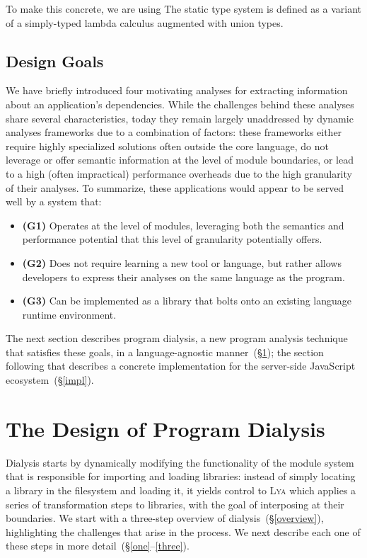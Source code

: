 \documentclass[letterpaper,twocolumn,10pt]{article}
\newcommand{\sx}[1]{(\S\ref{#1})}
\newcommand{\sys}{{\scshape Lya}\xspace}
\begin{document}
To make this concrete, we are using
The static type system is defined as a variant of a simply-typed lambda calculus augmented with union types.


\subsection{Design Goals}

We have briefly introduced four motivating analyses for extracting information about an application's dependencies.
While the challenges behind these analyses share several characteristics, today they remain largely unaddressed by dynamic analyses frameworks due to a combination of factors:
  these frameworks either require highly specialized solutions often outside the core language,
  do not leverage or offer semantic information at the level of module boundaries, or
  lead to a high (often impractical) performance overheads due to the high granularity of their analyses.
To summarize, these applications would appear to be served well by a system that:
\begin{itemize}
  \item \textbf{(G1)} Operates at the level of modules, leveraging both the semantics and performance potential that this level of granularity potentially offers.
  \item \textbf{(G2)} Does not require learning a new tool or language, but rather allows developers to express their analyses on the same language as the program.
  \item \textbf{(G3)} Can be implemented as a library that bolts onto an existing language runtime environment.
\end{itemize}

The next section describes program dialysis, a new program analysis technique that satisfies these goals, in a language-agnostic manner~\sx{design};
  the section following that describes a concrete implementation for the server-side JavaScript ecosystem~\sx{impl}.

\section{The Design of Program Dialysis}
\label{design}

Dialysis starts by dynamically modifying the functionality of the module system that is responsible for importing and loading libraries:
  instead of simply locating a library in the filesystem and loading it, it yields control to \sys which applies a series of transformation steps to libraries, with the goal of interposing at their boundaries.
We start with a three-step overview of dialysis~\sx{overview}, highlighting the challenges that arise in the process.
We next describe each one of these steps in more detail~(\S\ref{one}--\ref{three}).
\end{document}

